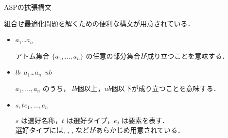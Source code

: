 \documentclass[dvipdfmx, 11pt]{beamer}
\begin{document}
\begin{frame}{ASPの拡張構文}
  \begin{alertblock}{}\centering
    組合せ最適化問題を解くための便利な構文が用意されている．
  \end{alertblock}

  \begin{itemize}
 \item {}
   \begin{center}
     \code{\{}$a_1$\code{;}\ldots\code{;}$a_n$\code{\}}
   \end{center}
   アトム集合 $\{a_1,\dots,a_n\}$
   の任意の部分集合が成り立つことを意味する．
 \item {}
   \begin{center}
     $lb$\ \code{\{}$a_1$\code{;}\ldots\code{;}$a_n$\code{\}}\ $ub$
   \end{center}
   $a_1,\dots,a_n$ のうち，
   $lb$個以上，$ub$個以下が成り立つことを意味する．
 \item {}
       \begin{center}
	$s,t$\code{)\{}$e_1,\dots,e_n$
       \end{center}
       $s$ は選好名称，$t$ は選好タイプ，$e_j$ は要素を表す．\\
       選好タイプには, , , 
       などがあらかじめ用意されている．
 \end{itemize}
\end{frame}
\end{document}
